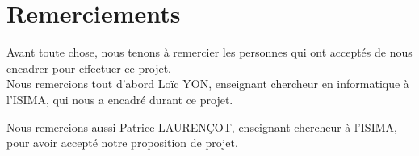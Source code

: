 \cleardoublepage



\chapter*{Remerciements}

\thispagestyle{empty}



Avant toute chose, nous tenons à remercier les personnes qui ont acceptés de nous encadrer pour effectuer ce projet.
\\


Nous remercions tout d'abord Loïc YON, enseignant chercheur en informatique à l'ISIMA, qui nous a encadré durant ce projet.

Nous remercions aussi Patrice LAURENÇOT, enseignant chercheur à l'ISIMA, pour avoir accepté notre proposition de projet.

